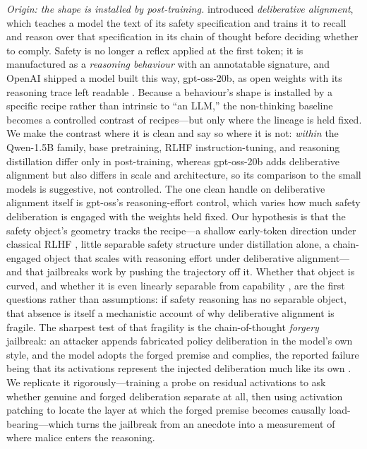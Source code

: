 \documentclass[10pt]{article}
\begin{document}
\emph{Origin: the shape is installed by post-training.} \citet{guan2024deliberative}
introduced \emph{deliberative alignment}, which teaches a model the text of its
safety specification and trains it to recall and reason over that specification in
its chain of thought before deciding whether to comply. Safety is no longer a
reflex applied at the first token; it is manufactured as a \emph{reasoning
behaviour} with an annotatable signature, and OpenAI shipped a model built this
way, \mbox{gpt-oss-20b}, as open weights with its reasoning trace left readable
\citep{openai2025gptoss}. Because a behaviour's shape is installed by a specific
recipe rather than intrinsic to ``an LLM,'' the non-thinking baseline becomes a
controlled contrast of recipes---but only where the lineage is held fixed. We make
the contrast where it is clean and say so where it is not: \emph{within} the
Qwen-1.5B family, base pretraining, RLHF instruction-tuning, and reasoning
distillation differ only in post-training, whereas \mbox{gpt-oss-20b} adds
deliberative alignment but also differs in scale and architecture, so its
comparison to the small models is suggestive, not controlled. The one clean handle
on deliberative alignment itself is gpt-oss's reasoning-effort control, which varies
how much safety deliberation is engaged with the weights held fixed. Our hypothesis
is that the safety object's geometry tracks the recipe---a shallow early-token
direction under classical RLHF \citep{qi2025shallow,arditi2024refusal}, little
separable safety structure under distillation alone, a chain-engaged object that
scales with reasoning effort under deliberative alignment---and that jailbreaks work
by pushing the trajectory off it. Whether that object is curved, and whether it is
even linearly separable from capability \citep{ponkshe2025safety}, are the first
questions rather than assumptions: if safety reasoning has no separable object, that
absence is itself a mechanistic account of why deliberative alignment is fragile.
The sharpest test of that fragility is the chain-of-thought \emph{forgery}
jailbreak: an attacker appends fabricated policy deliberation in the model's own
style, and the model adopts the forged premise and complies, the reported failure
being that its activations represent the injected deliberation much like its own
\citep{ye2025luckycoin}. We replicate it rigorously---training a probe on residual
activations to ask whether genuine and forged deliberation separate at all, then
using activation patching to locate the layer at which the forged premise becomes
causally load-bearing---which turns the jailbreak from an anecdote into a
measurement of where malice enters the reasoning.
\end{document}
